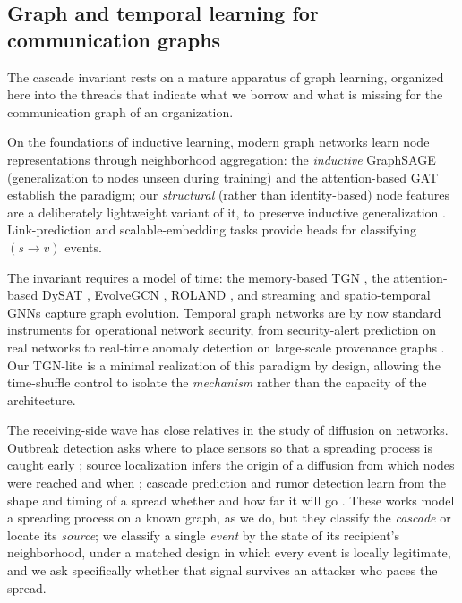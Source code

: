 \subsection{Graph and temporal learning for communication graphs}
\label{sec:rw-graph}
The cascade invariant rests on a mature apparatus of graph learning, organized here into the threads that
indicate what we borrow and what is missing for the communication graph of an organization.

On the foundations of inductive learning, modern graph networks learn node representations through
neighborhood aggregation: the \emph{inductive} GraphSAGE \citep{hamilton2017inductive} (generalization to nodes
unseen during training) and the attention-based GAT \citep{velickovic2018graph} establish the paradigm; our \emph{structural} (rather than identity-based) node features are a deliberately
lightweight variant of it, to preserve inductive generalization \citep{xu2020inductive,hao2020inductive}. Link-prediction and scalable-embedding tasks
\citep{zhang2018link,zhang2018scalable} provide heads for classifying $(s\!\to\!v)$ events.

The invariant requires a model of time: the memory-based TGN
\citep{rossi2020temporal}, the attention-based DySAT \citep{sankar2020dysat}, EvolveGCN \citep{pareja2020evolvegcn},
ROLAND \citep{you2022roland}, and streaming and spatio-temporal GNNs
\citep{yu2023streaming,wang2022tsgn,nayebi2025spatiotemporal,behrouz2022anomaly} capture graph evolution.
Temporal graph networks are by now standard instruments for operational network security, from
security-alert prediction on real networks \citep{nayeri2026alert} to real-time anomaly detection on
large-scale provenance graphs \citep{weng2024rtapt}. Our
TGN-lite is a minimal realization of this paradigm by design, allowing the time-shuffle control to isolate the
\emph{mechanism} rather than the capacity of the architecture.

The receiving-side wave has close relatives in the study of diffusion on networks. Outbreak detection asks
where to place sensors so that a spreading process is caught early \citep{leskovec2007outbreak}; source
localization infers the origin of a diffusion from which nodes were reached and when \citep{pinto2012locating,shah2011rumors};
cascade prediction and rumor detection learn from the shape and timing of a spread whether and how far it
will go \citep{cheng2014cascades,vosoughi2018spread,bian2020rumor}. These works model a spreading process on
a known graph, as we do, but they classify the \emph{cascade} or locate its \emph{source}; we classify a
single \emph{event} by the state of its recipient's neighborhood, under a matched design in which every event
is locally legitimate, and we ask specifically whether that signal survives an attacker who paces the
spread.

